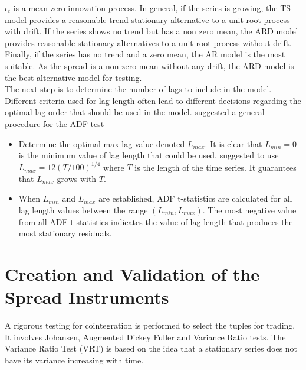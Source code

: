 \documentclass[11pt,a4,twosided,singlespacing,titlepagenumber=on]{scrreprt}
\numberwithin{equation}{chapter} %
\theoremstyle{remark}
\begin{document}
$\epsilon_t$ is a mean zero innovation process. In general, if the series is growing, the TS model provides a reasonable trend-stationary alternative to a unit-root process with drift. If the series shows no trend but has a non zero mean, the ARD model provides reasonable stationary alternatives to a unit-root process without drift. Finally, if the series has no trend and a zero mean, the AR model is the most suitable. As the spread is a non zero mean without any drift, the ARD model is the best alternative model for testing. \\

The next step is to determine the number of lags to include in the model. Different criteria used for lag length often lead to different decisions regarding the optimal lag order that should be used in the model. \cite{daoimpact} suggested a general procedure for the ADF test
\begin{itemize}
\item Determine the optimal max lag value denoted $L_{max}$. It is clear that $L_{min} = 0$ is the minimum value of lag length that could be used. \cite{schwert2002} suggested to use $L_{max} = 12 \left(T / 100 \right)^{1/4}$ where $T$ is the length of the time series. It guarantees that $L_{max}$ grows with $T$.
\item When $L_{min}$ and $L_{max}$ are established, ADF t-statistics are calculated for all lag length values between the range $(L_{min}, L_{max})$. The most negative value from all ADF t-statistics indicates the value of lag length that produces the most stationary residuals.
\end{itemize}

\section{Creation and Validation of the Spread Instruments}
A rigorous testing for cointegration is performed to select the tuples for trading. It involves Johansen, Augmented Dickey Fuller and Variance Ratio tests. The Variance Ratio Test (VRT) is based on the idea that a stationary series does not have its variance increasing with time. \\
\end{document}
